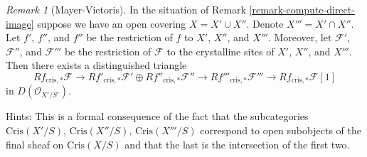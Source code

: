 \documentclass{stacks-project}
\theoremstyle{plain}
\theoremstyle{definition}
\theoremstyle{remark}
\newtheorem{remark}[subsection]{Remark}
\numberwithin{equation}{subsection}
\begin{document}
\begin{remark}[Mayer-Vietoris]
\label{remark-mayer-vietoris}
In the situation of Remark \ref{remark-compute-direct-image}
suppose we have an open covering $X = X' \cup X''$. Denote
$X''' = X' \cap X''$. Let $f'$, $f''$, and $f''$ be the restriction of $f$
to $X'$, $X''$, and $X'''$. Moreover, let $\mathcal{F}'$, $\mathcal{F}''$,
and $\mathcal{F}'''$ be the restriction of $\mathcal{F}$ to the crystalline
sites of $X'$, $X''$, and $X'''$. Then there exists a distinguished triangle
$$
Rf_{\text{cris}, *}\mathcal{F}
\longrightarrow
Rf'_{\text{cris}, *}\mathcal{F}' \oplus Rf''_{\text{cris}, *}\mathcal{F}''
\longrightarrow
Rf'''_{\text{cris}, *}\mathcal{F}'''
\longrightarrow
Rf_{\text{cris}, *}\mathcal{F}[1]
$$
in $D(\mathcal{O}_{X'/S'})$.

\medskip\noindent
Hints: This is a formal consequence of the fact that the subcategories
$\text{Cris}(X'/S)$, $\text{Cris}(X''/S)$, $\text{Cris}(X'''/S)$ correspond
to open subobjects of the final sheaf on $\text{Cris}(X/S)$ and that the
last is the intersection of the first two.
\end{remark}
\end{document}
